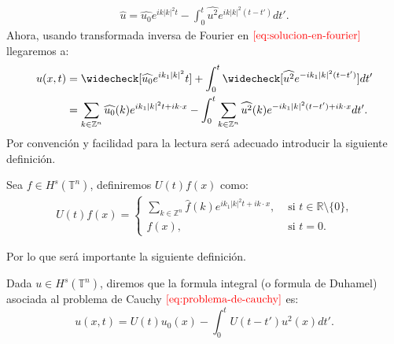     \begin{align}
      \hat{u}=\hat{u_0}e^{ik|k|^2t}-\int_{0}^{t}\hat{u^2}e^{ik|k|^2(t-t')}dt'.\label{eq:solucion-en-fourier}
    \end{align}
    Ahora, usando transformada inversa de Fourier en $\textcolor{red}{\ref{eq:solucion-en-fourier}}$ llegaremos a:
    \begin{align}
      u(x,t)&=\check{[\hat{u_0}e^{ik_1|k|^2}t]}+\int_{0}^{t}\check{[\hat{u^2}e^{-ik_1|k|^2(t-t')}]}dt'\notag{}\\
      &=\sum_{k\in\mathbb{Z}^{n}}\hat{u_0}(k)e^{ik_1|k|^2t+ik\cdot x}-\int_{0}^{t}\sum_{k\in\mathbb{Z}^{n}}\hat{u^2}(k)e^{-ik_1|k|^2(t-t')+ik\cdot x}dt'.
    \end{align}
    Por convención y facilidad para la lectura será adecuado introducir la siguiente definición.
    \begin{definition}
      Sea $f\in H^s(\mathbb{T}^{n})$, definiremos $U(t)f(x)$ como:
      \begin{align*}
        U(t)f(x)=\begin{cases}
          \sum_{k\in\mathbb{Z}^{n}}\hat{f}(k)e^{ik_1|k|^2t+ik\cdot x}, &\text{ si } t\in\mathbb{R}\setminus\{0\} \text{,} \\
          f(x), &\text{ si } t=0.
        \end{cases}
      \end{align*}
    \end{definition}
    Por lo que será importante la siguiente definición.
    \begin{definition}
      Dada $u\in H^s(\mathbb{T}^{n})$, diremos que la formula integral (o formula de Duhamel) asociada al problema de Cauchy $\textcolor{red}{\ref{eq:problema-de-cauchy}}$ es:
      \begin{equation}
        u(x,t)=U(t)u_0(x)-\int_{0}^{t}U(t-t')u^2(x)dt'.\label{eq:formula-integral}
      \end{equation}
    \end{definition}
